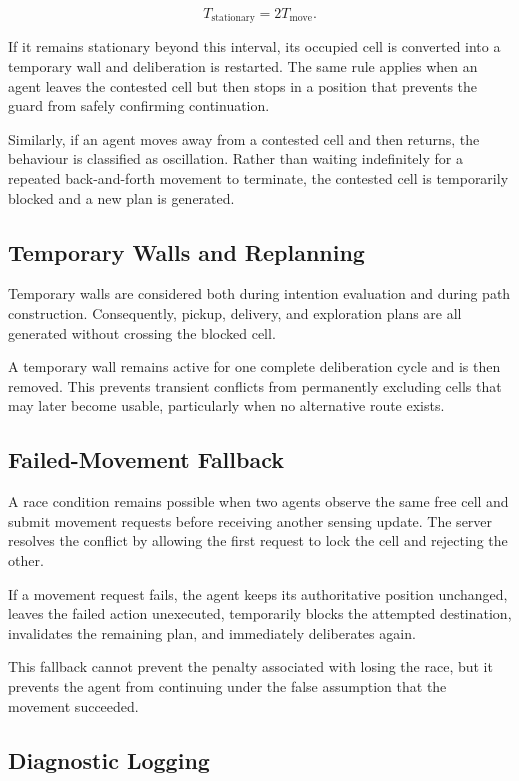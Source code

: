 \documentclass[a4paper]{article}
\begin{document}
\[
    T_{\mathrm{stationary}} = 2T_{\mathrm{move}}.
\]

If it remains stationary beyond this interval, its occupied cell is converted
into a temporary wall and deliberation is restarted. The same rule applies
when an agent leaves the contested cell but then stops in a position that
prevents the guard from safely confirming continuation.

Similarly, if an agent moves away from a contested cell and then returns, the
behaviour is classified as oscillation. Rather than waiting indefinitely for a
repeated back-and-forth movement to terminate, the contested cell is
temporarily blocked and a new plan is generated.

\subsection{Temporary Walls and Replanning}

Temporary walls are considered both during intention evaluation and during
path construction. Consequently, pickup, delivery, and exploration plans are
all generated without crossing the blocked cell.

A temporary wall remains active for one complete deliberation cycle and is
then removed. This prevents transient conflicts from permanently excluding
cells that may later become usable, particularly when no alternative route
exists.

\subsection{Failed-Movement Fallback}

A race condition remains possible when two agents observe the same free cell
and submit movement requests before receiving another sensing update. The
server resolves the conflict by allowing the first request to lock the cell
and rejecting the other.

If a movement request fails, the agent keeps its authoritative position
unchanged, leaves the failed action unexecuted, temporarily blocks the attempted
destination, invalidates the remaining plan, and immediately deliberates again.

This fallback cannot prevent the penalty associated with losing the race, but
it prevents the agent from continuing under the false assumption that the
movement succeeded.

\subsection{Diagnostic Logging}
\end{document}
